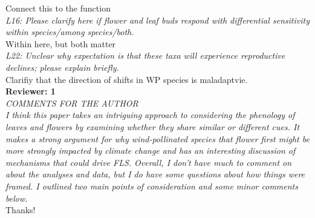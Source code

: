 \documentclass[11pt]{article}
\begin{document}
Connect this to the function\\

\emph{L16: Please clarify here if flower and leaf buds respond with differential sensitivity within species/among species/both.}\\

Within here, but both matter\\

\emph{L22: Unclear why expectation is that these taxa will experience reproductive declines; please explain briefly.}\\
Clarifiy that the direction of shifts in WP species is maladaptvie.\\

\textbf{Reviewer: 1}\\

\emph{COMMENTS FOR THE AUTHOR\\
I think this paper takes an intriguing approach to considering the phenology of leaves and flowers by examining whether they share similar or different cues. It makes a strong argument for why wind-pollinated species that flower first might be more strongly impacted by climate change and has an interesting discussion of mechanisms that could drive FLS. Overall, I don’t have much to comment on about the analyses and data, but I do have some questions about how things were framed. I outlined two main points of consideration and some minor comments below.}\\

Thanks!\\
\end{document}
